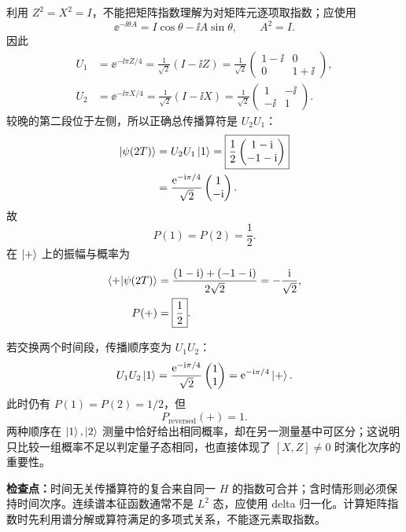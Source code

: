 \begin{checkedsolution}
利用 $Z^2=X^2=I$，不能把矩阵指数理解为对矩阵元逐项取指数；应使用
\begin{equation}
  \ee^{-\ii\theta A}=I\cos\theta-\ii A\sin\theta,
  \qquad A^2=I.
  \label{eq:QM-C04-S03-E03-exponential-identity}
\end{equation}
因此
\begin{align}
  U_1&=\ee^{-\ii\pi Z/4}
  =\frac1{\sqrt2}(I-\ii Z)
  =\frac1{\sqrt2}
    \begin{pmatrix}1-\ii&0\\0&1+\ii\end{pmatrix},
  \label{eq:QM-C04-S03-E03-U1}\\
  U_2&=\ee^{-\ii\pi X/4}
  =\frac1{\sqrt2}(I-\ii X)
  =\frac1{\sqrt2}
    \begin{pmatrix}1&-\ii\\-\ii&1\end{pmatrix}.
  \label{eq:QM-C04-S03-E03-U2}
\end{align}
较晚的第二段位于左侧，所以正确总传播算符是 $U_2U_1$：
\begin{align}
  \left|\psi(2T)\right\rangle
  &=U_2U_1\left|1\right\rangle
   =\boxed{\frac12
    \begin{pmatrix}1-\mathrm{i}\\-1-\mathrm{i}\end{pmatrix}}
  \notag\\
  &=\frac{\mathrm{e}^{-\mathrm{i}\pi/4}}{\sqrt2}
    \begin{pmatrix}1\\-\mathrm{i}\end{pmatrix}.
  \label{eq:QM-C04-S03-E03-correct-state}
\end{align}
故
\begin{equation}
  P(1)=P(2)=\frac12.
  \label{eq:QM-C04-S03-E03-z-probabilities}
\end{equation}
在 $\left|+\right\rangle$ 上的振幅与概率为
\begin{align}
  \left\langle + \middle| \psi(2T) \right\rangle
  &=\frac{(1-\mathrm{i})+(-1-\mathrm{i})}{2\sqrt2}
   =-\frac{\mathrm{i}}{\sqrt2},
  \label{eq:QM-C04-S03-E03-plus-amplitude}\\
  P(+)&=\boxed{\frac12}.
  \label{eq:QM-C04-S03-E03-plus-probability}
\end{align}

若交换两个时间段，传播顺序变为 $U_1U_2$：
\begin{equation}
  U_1U_2\left|1\right\rangle
  =\frac{\mathrm{e}^{-\mathrm{i}\pi/4}}{\sqrt2}
    \begin{pmatrix}1\\1\end{pmatrix}
  =\mathrm{e}^{-\mathrm{i}\pi/4}\left|+\right\rangle.
  \label{eq:QM-C04-S03-E03-reversed-state}
\end{equation}
此时仍有 $P(1)=P(2)=1/2$，但
\begin{equation}
  \boxed{P_{\mathrm{reversed}}(+)=1}.
  \label{eq:QM-C04-S03-E03-reversed-plus-probability}
\end{equation}
两种顺序在 $\left|1\right\rangle,\left|2\right\rangle$ 测量中恰好给出相同概率，却在另一测量基中可区分；这说明只比较一组概率不足以判定量子态相同，也直接体现了 $[X,Z]\neq0$ 时演化次序的重要性。
\end{checkedsolution}

\textbf{检查点：}时间无关传播算符的复合来自同一 $H$ 的指数可合并；含时情形则必须保持时间次序。连续谱本征函数通常不是 $L^2$ 态，应使用 delta 归一化。计算矩阵指数时先利用谱分解或算符满足的多项式关系，不能逐元素取指数。
